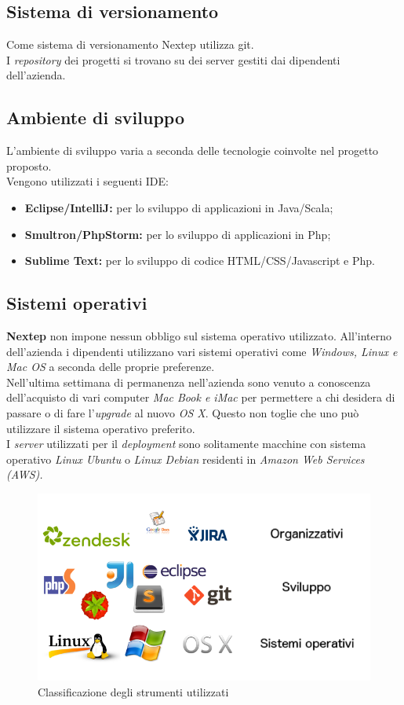 \subsection*{Sistema di versionamento}
Come sistema di versionamento Nextep utilizza \gls{git}.\\
I \textit{repository }dei progetti si trovano su dei server gestiti dai dipendenti dell'azienda.

\subsection*{Ambiente di sviluppo}
L'ambiente di sviluppo varia a seconda delle tecnologie coinvolte nel progetto proposto.\\
Vengono utilizzati i seguenti \gls{IDE}:
\begin{itemize}
	\item \textbf{Eclipse/IntelliJ: }per lo sviluppo di applicazioni in Java/Scala;
	\item \textbf{Smultron/PhpStorm: }per lo sviluppo di applicazioni in Php;
	\item \textbf{Sublime Text: }per lo sviluppo di codice HTML/CSS/Javascript e Php.
\end{itemize}

\subsection*{Sistemi operativi}
\textbf{Nextep} non impone nessun obbligo sul sistema operativo utilizzato. All'interno dell'azienda i dipendenti utilizzano vari sistemi operativi come \textit{Windows, Linux e Mac OS} a seconda delle proprie preferenze.\\
Nell'ultima settimana di permanenza nell'azienda sono venuto a conoscenza dell'acquisto di vari computer \textit{Mac Book e iMac }per permettere a chi desidera di passare o di fare l'\textit{upgrade }al nuovo \textit{OS X}. Questo non toglie che uno può utilizzare il sistema operativo preferito.\\
I \textit{server }utilizzati per il \textit{deployment }sono solitamente macchine con sistema operativo \textit{Linux Ubuntu} o \textit{Linux Debian} residenti in \textit{Amazon Web Services (AWS).}

\begin{figure}[h]
\centering
\includegraphics[width=0.7\linewidth]{immagini/gestione}
\caption[Classificazione degli strumenti utilizzati]{Classificazione degli strumenti utilizzati}
\label{fig:gestione}
\end{figure}


